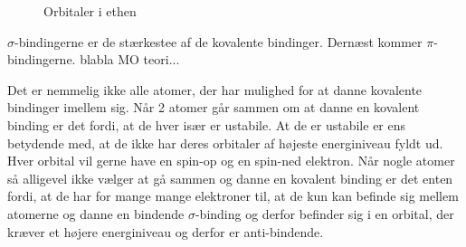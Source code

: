 \begin{figure}
\begin{center}
\end{center}
\caption{Orbitaler i ethen \label{fig:ethen}}
\end{figure}

$\sigma$-bindingerne er de stærkestee af de kovalente bindinger. Dernæst kommer $\pi$-bindingerne. blabla MO teori...


Det er nemmelig ikke alle atomer, der har mulighed for at danne kovalente bindinger imellem sig. Når 2 atomer går sammen om at danne en kovalent binding er det fordi, at de hver især er ustabile. At de er ustabile er ens betydende med, at de ikke har deres orbitaler af højeste energiniveau fyldt ud. Hver orbital vil gerne have en spin-op og en spin-ned elektron. Når nogle atomer så alligevel ikke vælger at gå sammen og danne en kovalent binding er det enten fordi, at de har for mange mange elektroner til, at de kun kan befinde sig mellem atomerne og danne en bindende $\sigma$-binding og derfor befinder sig i en orbital, der kræver et højere energiniveau og derfor er anti-bindende. 


